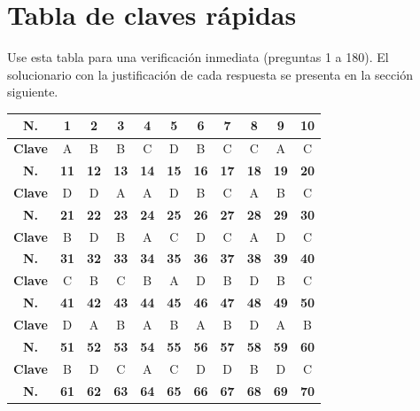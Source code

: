 \newpage
\section*{Tabla de claves rápidas}

\noindent Use esta tabla para una verificación inmediata (preguntas 1 a 180). El solucionario con la justificación de cada respuesta se presenta en la sección siguiente.

\vspace{0.35cm}
\begin{center}
\footnotesize
\renewcommand{\arraystretch}{1.25}
\begin{tabular}{|c|c|c|c|c|c|c|c|c|c|c|}
\hline
\textbf{N.} & \textbf{1} & \textbf{2} & \textbf{3} & \textbf{4} & \textbf{5} & \textbf{6} & \textbf{7} & \textbf{8} & \textbf{9} & \textbf{10} \\
\hline
\textbf{Clave} & A & B & B & C & D & B & C & C & A & C \\
\hline
\textbf{N.} & \textbf{11} & \textbf{12} & \textbf{13} & \textbf{14} & \textbf{15} & \textbf{16} & \textbf{17} & \textbf{18} & \textbf{19} & \textbf{20} \\
\hline
\textbf{Clave} & D & D & A & A & D & B & C & A & B & C \\
\hline
\textbf{N.} & \textbf{21} & \textbf{22} & \textbf{23} & \textbf{24} & \textbf{25} & \textbf{26} & \textbf{27} & \textbf{28} & \textbf{29} & \textbf{30} \\
\hline
\textbf{Clave} & B & D & B & A & C & D & C & A & D & C \\
\hline
\textbf{N.} & \textbf{31} & \textbf{32} & \textbf{33} & \textbf{34} & \textbf{35} & \textbf{36} & \textbf{37} & \textbf{38} & \textbf{39} & \textbf{40} \\
\hline
\textbf{Clave} & C & B & C & B & A & D & B & D & B & C \\
\hline
\textbf{N.} & \textbf{41} & \textbf{42} & \textbf{43} & \textbf{44} & \textbf{45} & \textbf{46} & \textbf{47} & \textbf{48} & \textbf{49} & \textbf{50} \\
\hline
\textbf{Clave} & D & A & B & A & B & A & B & D & A & B \\
\hline
\textbf{N.} & \textbf{51} & \textbf{52} & \textbf{53} & \textbf{54} & \textbf{55} & \textbf{56} & \textbf{57} & \textbf{58} & \textbf{59} & \textbf{60} \\
\hline
\textbf{Clave} & B & D & C & A & C & D & D & B & D & C \\
\hline
\textbf{N.} & \textbf{61} & \textbf{62} & \textbf{63} & \textbf{64} & \textbf{65} & \textbf{66} & \textbf{67} & \textbf{68} & \textbf{69} & \textbf{70} \\

\end{tabular}
\end{center}
